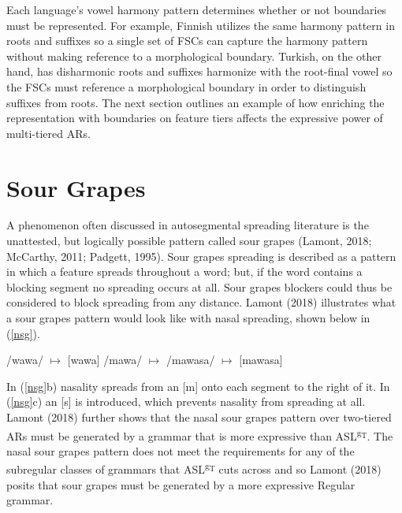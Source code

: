 \documentclass[,doc,floatsintext]{apa6}
\theoremstyle{definition}
\theoremstyle{definition}
\theoremstyle{definition}
\theoremstyle{remark}
\begin{document}
Each language's vowel harmony pattern determines whether or not
boundaries must be represented. For example, Finnish utilizes the same
harmony pattern in roots and suffixes so a single set of FSCs can
capture the harmony pattern without making reference to a morphological
boundary. Turkish, on the other hand, has disharmonic roots and suffixes
harmonize with the root-final vowel so the FSCs must reference a
morphological boundary in order to distinguish suffixes from roots. The
next section outlines an example of how enriching the representation
with boundaries on feature tiers affects the expressive power of
multi-tiered ARs.

\section{Sour Grapes}\label{sour-grapes}

A phenomenon often discussed in autosegmental spreading literature is
the unattested, but logically possible pattern called sour grapes
(Lamont, 2018; McCarthy, 2011; Padgett, 1995). Sour grapes spreading is
described as a pattern in which a feature spreads throughout a word;
but, if the word contains a blocking segment no spreading occurs at all.
Sour grapes blockers could thus be considered to block spreading from
any distance. Lamont (2018) illustrates what a sour grapes pattern would
look like with nasal spreading, shown below in (\ref{nsg}).

\begin{exe}
\label{nsg}
\begin{xlist}
  \ex /wawa/ $\mapsto$ [wawa]
  \ex /mawa/ $\mapsto$ \textipa{[m\~a\~w\~a]}
  \ex /mawasa/ $\mapsto$ [mawasa]
\end{xlist}
\end{exe}

\noindent In (\ref{nsg}b) nasality spreads from an {[}m{]} onto each
segment to the right of it. In (\ref{nsg}c) an {[}s{]} is introduced,
which prevents nasality from spreading at all. Lamont (2018) further
shows that the nasal sour grapes pattern over two-tiered ARs must be
generated by a grammar that is more expressive than
ASL\textsuperscript{g\textsubscript{T}}. The nasal sour grapes pattern
does not meet the requirements for any of the subregular classes of
grammars that ASL\textsuperscript{g\textsubscript{T}} cuts across and so
Lamont (2018) posits that sour grapes must be generated by a more
expressive Regular grammar.
\end{document}
